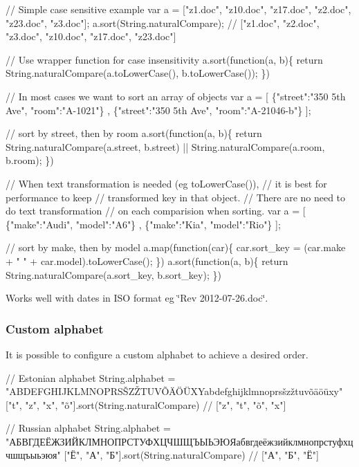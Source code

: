 \begin{DoxyCode}
// Simple case sensitive example
var a = ["z1.doc", "z10.doc", "z17.doc", "z2.doc", "z23.doc", "z3.doc"];
a.sort(String.naturalCompare);
// ["z1.doc", "z2.doc", "z3.doc", "z10.doc", "z17.doc", "z23.doc"]

// Use wrapper function for case insensitivity
a.sort(function(a, b)\{
  return String.naturalCompare(a.toLowerCase(), b.toLowerCase());
\})

// In most cases we want to sort an array of objects
var a = [ \{"street":"350 5th Ave", "room":"A-1021"\}
        , \{"street":"350 5th Ave", "room":"A-21046-b"\} ];

// sort by street, then by room
a.sort(function(a, b)\{
  return String.naturalCompare(a.street, b.street) || String.naturalCompare(a.room, b.room);
\})

// When text transformation is needed (eg toLowerCase()),
// it is best for performance to keep
// transformed key in that object.
// There are no need to do text transformation
// on each comparision when sorting.
var a = [ \{"make":"Audi", "model":"A6"\}
        , \{"make":"Kia",  "model":"Rio"\} ];

// sort by make, then by model
a.map(function(car)\{
  car.sort\_key = (car.make + " " + car.model).toLowerCase();
\})
a.sort(function(a, b)\{
  return String.naturalCompare(a.sort\_key, b.sort\_key);
\})
\end{DoxyCode}



\begin{DoxyItemize}
\item Works well with dates in I\+SO format eg \char`\"{}\+Rev 2012-\/07-\/26.\+doc\char`\"{}.
\end{DoxyItemize}

\subsubsection*{Custom alphabet}

It is possible to configure a custom alphabet to achieve a desired order.


\begin{DoxyCode}
// Estonian alphabet
String.alphabet = "ABDEFGHIJKLMNOPRSŠZŽTUVÕÄÖÜXYabdefghijklmnoprsšzžtuvõäöüxy"
["t", "z", "x", "õ"].sort(String.naturalCompare)
// ["z", "t", "õ", "x"]

// Russian alphabet
String.alphabet = "АБВГДЕЁЖЗИЙКЛМНОПРСТУФХЦЧШЩЪЫЬЭЮЯабвгдеёжзийклмнопрстуфхцчшщъыьэюя"
["Ё", "А", "Б"].sort(String.naturalCompare)
// ["А", "Б", "Ё"]
\end{DoxyCode}


